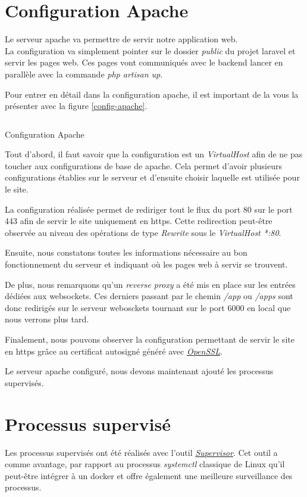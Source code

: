 \documentclass[
    iai, %
    il, %
]{heig-tb}
\begin{document}
\section{Configuration Apache}
Le serveur \Gls{apache} va permettre de servir notre application web. \\
La configuration va simplement pointer sur le dossier \emph{public} du projet \Gls{laravel} et servir les pages web. Ces pages vont communiqués avec le \Gls{backend} lancer en parallèle avec la commande \emph{php artisan up}.

Pour entrer en détail dans la configuration \Gls{apache}, il est important de la vous la présenter avec la figure \ref{config-apache}.

\begin{listing}[H]
    \inputminted{text}{assets/code/config-apache.conf}
    \caption{Configuration Apache \label{config-apache}}
\end{listing}

Tout d'abord, il faut savoir que la configuration est un \emph{VirtualHost} afin de ne pas toucher aux configurations de base de \Gls{apache}. Cela permet d'avoir plusieurs configurations établies sur le serveur et d'ensuite choisir laquelle est utilisée pour le site.

La configuration réalisée permet de rediriger tout le flux du port 80 sur le port 443 afin de servir le site uniquement en \Gls{https}. Cette redirection peut-être observée au niveau des opérations de type \emph{Rewrite} sous le \emph{VirtualHost *:80}.

Ensuite, nous constatons toutes les informations nécessaire au bon fonctionnement du serveur et indiquant où les pages web à servir se trouvent.

De plus, nous remarquons qu'un \emph{reverse proxy} a été mis en place sur les entrées dédiées aux \Gls{websockets}. Ces derniers passant par le chemin \emph{/app} ou \emph{/apps} sont donc redirigés sur le serveur webosckets tournant sur le port 6000 en local que nous verrons plus tard.

Finalement, nous pouvons observer la configuration permettant de servir le site en  \Gls{https} grâce au certificat autosigné généré avec \href{https://www.openssl.org/}{\emph{OpenSSL}}.

Le serveur \Gls{apache} configuré, nous devons maintenant ajouté les processus supervisés.

\section{Processus supervisé}
Les processus supervisés ont été réalisés avec l'outil \href{http://supervisord.org/}{\emph{Supervisor}}. Cet outil a comme avantage, par rapport au processus \emph{systemctl} classique de Linux qu'il peut-être intégrer à un \Gls{docker} et offre également une meilleure surveillance des processus.
\end{document}
